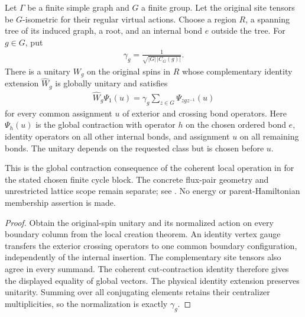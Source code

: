 \begin{theorem}%
    \label{thm:peps_regular_cycle_global_flux_creation}
    \leanok
    Let $\Gamma$ be a finite simple graph and $G$ a finite group. Let the original
    site tensors be $G$-isometric for their regular virtual actions. Choose a
    region $R$, a spanning tree of its induced graph, a root, and an internal
    bond $e$ outside the tree. For $g\in G$, put
    \begin{align}
        \gamma_g=\frac{1}{\sqrt{|G|\,|C_G(g)|}}.
    \end{align}
    There is a unitary $W_g$ on the original spins in $R$ whose complementary
    identity extension $\widehat W_g$ is globally unitary and satisfies
    \begin{align}
        \widehat W_g\Psi_1(u)
        =\gamma_g\sum_{z\in G}\Psi_{zgz^{-1}}(u)
    \end{align}
    for every common assignment $u$ of exterior and crossing bond operators.
    Here $\Psi_h(u)$ is the global contraction with operator $h$ on
    the chosen ordered bond $e$, identity operators on all other internal
    bonds, and assignment $u$ on all remaining bonds. The unitary depends on
    the requested class but is chosen before $u$.

    This is the global contraction consequence of the coherent local
    operation in \cite[Theorem~6.17]{Schuch2010PEPS} for the stated chosen
    finite cycle block. The concrete flux-pair geometry and unrestricted
    lattice scope remain separate; see
    \cite{gap:rmp_peps_quantum_double_g_isometry}. No energy or
    parent-Hamiltonian membership assertion is made.
\end{theorem}

\begin{proof}\leanok
    Obtain the original-spin unitary and its normalized action on every
    boundary column from the local creation theorem. An identity vertex
    gauge transfers the exterior crossing operators to one common boundary
    configuration, independently of the internal insertion. The complementary
    site tensors also agree in every summand. The coherent cut-contraction
    identity therefore gives the displayed equality of global vectors.
    The physical identity extension preserves unitarity. Summing over all
    conjugating elements retains their centralizer multiplicities, so the
    normalization is exactly $\gamma_g$.
\end{proof}
